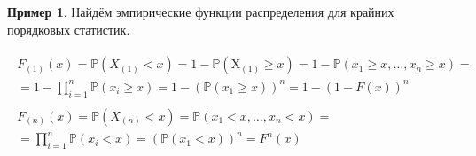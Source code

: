 \documentclass[oneside,final,14pt]{extreport}
\theoremstyle{definition}
\newtheorem*{exmp}{Пример}
\begin{document}
\begin{exmp}
Найдём эмпирические функции распределения для крайних порядковых статистик.

\begin{gather*}
    \begin{aligned}
        F_{(1)}(x)=\mathbb{P}(X_{(1)} < x) 
    = 1 - \mathbb{P} (\mathrm{X}_{(1)} \geq x) 
    = 1 - \mathbb{P}(x_{1} \geq x, \ldots, x_{n} \geq x) = \\
    = 1 - \prod_{i=1}^{n} \mathbb{P}(x_{i} \geq x) 
    = 1 - (\mathbb{P}({x}_{1} \geq x))^{n} 
    = 1 - (1 - F(x))^{n} 
    \end{aligned} \\
    \begin{aligned}
        F_{(n)}(x) 
        = \mathbb{P}(X_{(n)} < x) 
        = \mathbb{P}(x_{1} < x, \ldots, x_{n} < x) = \\
        = \prod_{i=1}^{n} \mathbb{P}(x_{i} < x) 
        = (\mathbb{P}({x}_{1} < x))^{n} 
        = F^{n}(x)
    \end{aligned}
\end{gather*}
\end{exmp}
\end{document}
